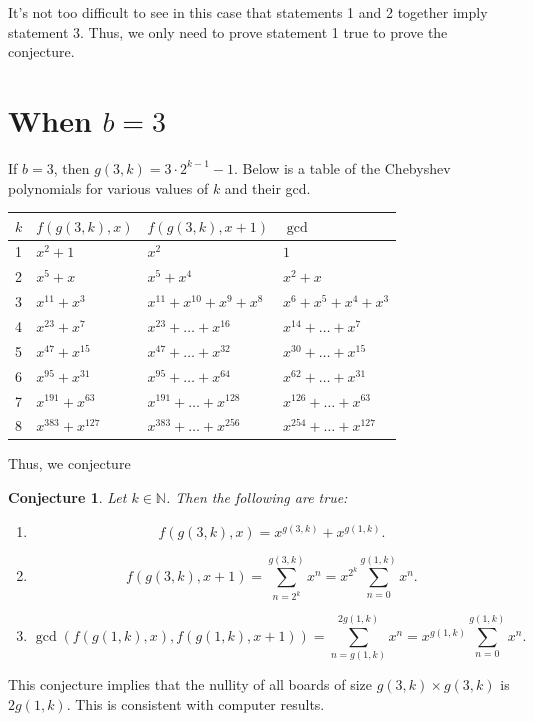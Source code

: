 \documentclass{article}
\newtheorem{conjecture}{Conjecture}
\newcommand{\N}{\mathbb{N}}
\begin{document}
	It's not too difficult to see in this case that statements 1 and 2 together imply statement 3.
	Thus, we only need to prove statement 1 true to prove the conjecture.
	
	\newpage
	\section{When $b = 3$}
	If $b=3$, then $g(3,k) = 3\cdot2^{k-1} - 1$.
	Below is a table of the Chebyshev polynomials for various values of $k$ and their gcd.
	
	\begin{table}[H]
		\renewcommand{\arraystretch}{1.5}
		\centering
		\begin{tabular}{|l||l|l|l|}
			\hline
			$k$ & $f(g(3,k),x)$ & $f(g(3,k),x+1)$ & $\gcd$  \\
			\hline\hline
			1 & $x^2 + 1$ & $x^2$ & $1$ \\
			\hline
			2 & $x^5 + x$ & $x^5 + x^4$ & $x^2 + x$ \\
			\hline
			3 & $x^{11} + x^3$ & $x^{11} + x^{10} + x^9 + x^8$ & $x^6 + x^5 + x^4 + x^3$ \\
			\hline
			4 & $x^{23} + x^{7}$ & $x^{23} + \dots + x^{16}$ & $x^{14} + \dots + x^7$ \\
			\hline
			5 & $x^{47} + x^{15}$ & $x^{47} + \dots + x^{32}$ & $x^{30} + \dots + x^{15}$ \\
			\hline
			6 & $x^{95} + x^{31}$ & $x^{95} + \dots + x^{64}$ & $x^{62} + \dots + x^{31}$ \\
			\hline
			7 & $x^{191} + x^{63}$ & $x^{191} + \dots + x^{128}$ & $x^{126} + \dots + x^{63}$ \\
			\hline
			8 & $x^{383} + x^{127}$ & $x^{383} + \dots + x^{256}$ & $x^{254} + \dots + x^{127}$ \\
			\hline  
		\end{tabular}
	\end{table}
	Thus, we conjecture
	\begin{conjecture}
		Let $k \in \N$.
		Then the following are true:
		\begin{enumerate}
			\item
			\begin{equation*}
				f(g(3,k),x) = x^{g(3,k)} + x^{g(1,k)}.
			\end{equation*}
			\item
			\begin{equation*}
				f(g(3,k),x+1) = \sum_{n=2^k}^{g(3,k)}{x^n} = x^{2^k}\sum_{n=0}^{g(1,k)}{x^n}.
			\end{equation*}
			\item
			\begin{equation*}
				\gcd\left({f(g(1,k),x), f(g(1,k),x+1)}\right) = \sum_{n=g(1,k)}^{2g(1,k)}{x^n} = x^{g(1,k)}\sum_{n=0}^{g(1,k)}{x^n}.
			\end{equation*}
		\end{enumerate}
	\end{conjecture}
	This conjecture implies that the nullity of all boards of size $g(3,k) \times g(3,k)$ is $2g(1,k)$.
	This is consistent with computer results. \\
	
\end{document}
